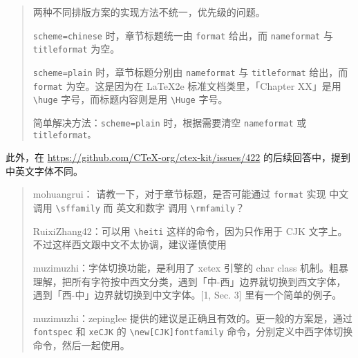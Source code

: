 \documentclass[../Main/thesis.tex]{subfiles}
\begin{document}
\begin{quote}
两种不同排版方案的实现方法不统一，优先级的问题。

\texttt{scheme=chinese} 时，章节标题统一由 \texttt{format} 给出，而
\texttt{nameformat} 与 \texttt{titleformat} 为空。

\texttt{scheme=plain} 时，章节标题分别由 \texttt{nameformat} 与
\texttt{titleformat} 给出，而 \texttt{format} 为空。这是因为在 LaTeX2e
标准文档类里，「Chapter XX」是用 \texttt{\textbackslash{}huge}
字号，而标题内容则是用 \texttt{\textbackslash{}Huge} 字号。

简单解决方法：\texttt{scheme=plain} 时，根据需要清空 \texttt{nameformat}
或 \texttt{titleformat。}
\end{quote}

\begin{Shaded}
\begin{Highlighting}[]
\NormalTok{[scheme=plain]\{}\NormalTok{\}}
\NormalTok{\{}
\NormalTok{,}
\NormalTok{  \}}
\NormalTok{\}}
\end{Highlighting}
\end{Shaded}

此外，在 \url{https://github.com/CTeX-org/ctex-kit/issues/422}
的后续回答中，提到中英文字体不同。

\begin{quote}
mohuangrui： 请教一下，对于章节标题，是否可能通过 \texttt{format} 实现
中文 调用 \texttt{\textbackslash{}sffamily} 而 英文和数字 调用
\texttt{\textbackslash{}rmfamily}？

RuixiZhang42：可以用 \texttt{\textbackslash{}heiti}
这样的命令，因为只作用于 CJK
文字上。不过这样西文跟中文不太协调，建议谨慎使用

muzimuzhi：字体切换功能，是利用了 xetex 引擎的 char class
机制。粗暴理解，把所有字符按中西文分类，遇到「中-西」边界就切换到西文字体，遇到「西-中」边界就切换到中文字体。{[}1,
Sec. 3{]} 里有一个简单的例子。

muzimuzhi：zepinglee 提供的建议是正确且有效的。更一般的方案是，通过
\texttt{fontspec} 和 \texttt{xeCJK} 的
\texttt{\textbackslash{}new{[}CJK{]}fontfamily}
命令，分别定义中西字体切换命令，然后一起使用。
\end{quote}

\begin{Shaded}
\end{Shaded}
\end{document}
